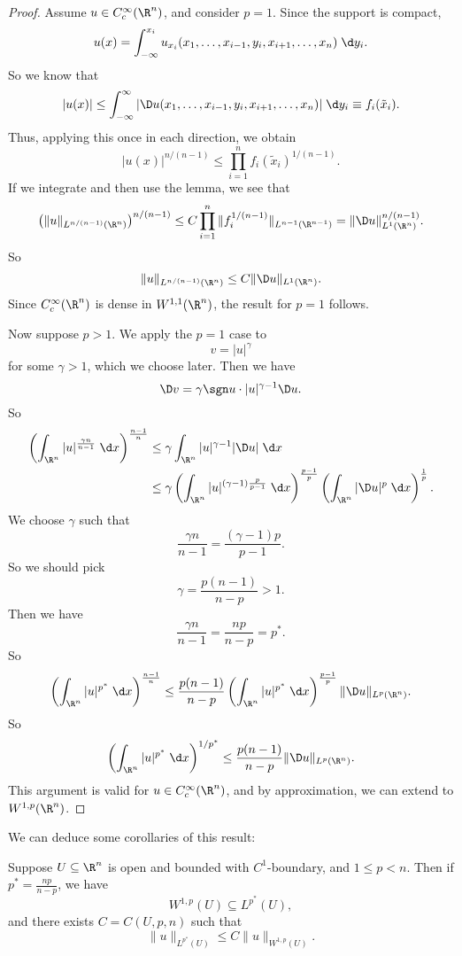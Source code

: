 \documentclass[a4paper]{article}
\begin{document}
\begin{proof}
  Assume $u \in C_c^\infty(\R^n)$, and consider $p = 1$. Since the support is compact,
  \[
    u(x) = \int_{-\infty}^{x_i} u_{x_i}(x_1 ,\ldots, x_{i - 1}, y_i, x_{i + 1}, \ldots, x_n)\;\d y_i.
  \]
  So we know that
  \[
    |u(x)| \leq \int_{-\infty}^\infty |\D u(x_1, \ldots, x_{i - 1}, y_i, x_{i + 1}, \ldots, x_n)|\;\d y_i \equiv f_i(\tilde{x}_i).
  \]
  Thus, applying this once in each direction, we obtain
  \[
    |u(x)|^{n/(n - 1)} \leq \prod_{i = 1}^n f_i(\tilde{x}_i)^{1/(n - 1)}.
  \]
  If we integrate and then use the lemma, we see that
  \[
    \left(\|u\|_{L^{n/(n - 1)}(\R^n)}\right)^{n/(n - 1)} \leq C \prod_{i = 1}^n \|f_i^{1/(n - 1)}\|_{L^{n - 1}(\R^{n - 1})} = \|\D u\|_{L^1(\R^n)}^{n/(n-1)}.
  \]
  So
  \[
    \|u\|_{L^{n/(n-1)}(\R^n)} \leq C \|\D u\|_{L^1(\R^n)}.
  \]
  Since $C^\infty_c(\R^n)$ is dense in $W^{1, 1}(\R^n)$, the result for $p = 1$ follows.

  Now suppose $p > 1$. We apply the $p = 1$ case to
  \[
    v = |u|^\gamma
  \]
  for some $\gamma > 1$, which we choose later. Then we have
  \[
    \D v = \gamma \sgn u \cdot |u|^{\gamma - 1} \D u.
  \]
  So
  \begin{align*}
    \left(\int_{\R^n} |u|^{\frac{\gamma n}{n-1}} \;\d x\right)^{\frac{n - 1}{n}} &\leq \gamma \int_{\R^n} |u|^{\gamma - 1}|\D u|\;\d x\\
    &\leq \gamma \left(\int_{\R^n} |u|^{(\gamma - 1) \frac{p}{p - 1}}\;\d x\right)^{\frac{p - 1}{p}} \left(\int_{\R^n} |\D u|^p \;\d x\right)^{\frac{1}{p}}.
  \end{align*}
  We choose $\gamma$ such that
  \[
    \frac{\gamma n}{n - 1} = \frac{(\gamma - 1)p}{p - 1}.
  \]
  So we should pick
  \[
    \gamma = \frac{p(n - 1)}{n - p} > 1.
  \]
  Then we have
  \[
    \frac{\gamma n}{n - 1} = \frac{np}{n - p} = p^*.
  \]
  So
  \[
    \left(\int_{\R^n} |u|^{p^*}\;\d x\right)^{\frac{n - 1}{n}} \leq \frac{p(n - 1)}{n - p}\left(\int_{\R^n} |u|^{p^*}\;\d x \right)^{\frac{p - 1}{p}} \|\D u\|_{L^p(\R^n)}.
  \]
  So
  \[
    \left(\int_{\R^n}|u|^{p^*}\;\d x\right)^{1/p^*} \leq \frac{p(n - 1)}{n - p} \|\D u\|_{L^p(\R^n)}.
  \]
  This argument is valid for $u \in C_c^\infty(\R^n)$, and by approximation, we can extend to $W^{1, p}(\R^n)$.
\end{proof}

We can deduce some corollaries of this result:
\begin{cor}
  Suppose $U \subseteq \R^n$ is open and bounded with $C^1$-boundary, and $1 \leq p < n$. Then if $p^* = \frac{np}{n - p}$, we have
  \[
    W^{1, p}(U) \subseteq L^{p^*}(U),
  \]
  and there exists $C = C(U, p, n)$ such that
  \[
    \|u\|_{L^{p^*}(U)} \leq C\|u\|_{W^{1, p}(U)}.
  \]
\end{cor}
\end{document}
